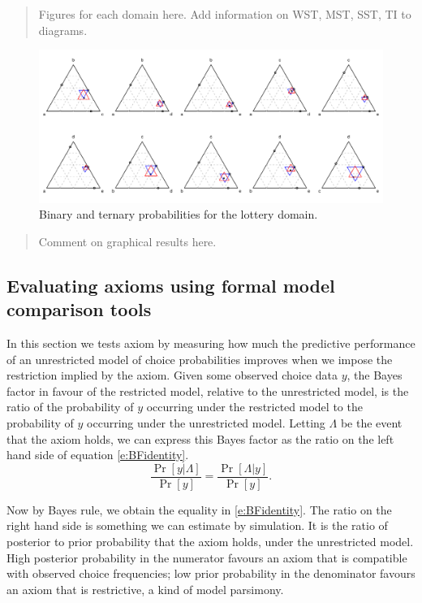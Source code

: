 \documentclass[11pt,letter]{article}
\begin{document}
\begin{quotation}
	Figures for each domain here. Add information on WST, MST, SST, TI to diagrams.
\end{quotation}

\begin{figure}
	\caption{Binary and ternary probabilities for the lottery domain.}\label{f:Dzero}
	\centering
	\includegraphics[width=16cm]{Figures/multi_aggregate_triples.pdf}
\end{figure}

\begin{quotation}
	Comment on graphical results here.
\end{quotation}

\subsection{Evaluating axioms using formal model comparison tools}

In this section we tests axiom by measuring how much the predictive performance of an unrestricted model of choice probabilities improves when we impose the restriction implied by the axiom.
Given some observed choice data $y$, the Bayes factor in favour of the restricted model, relative to the unrestricted model, is the ratio of the probability of $y$ occurring under the restricted model to the probability of $y$ occurring under the unrestricted model.
Letting $\Lambda$ be the event that the axiom holds, we can express this Bayes factor as the ratio on the left hand side of equation \eqref{e:BFidentity}.
\begin{equation}\label{e:BFidentity}
	\frac{\Pr[y|\Lambda]}{\Pr[y]} = \frac{\Pr[\Lambda|y]}{\Pr[y]}.
\end{equation}

Now by Bayes rule, we obtain the equality in \eqref{e:BFidentity}.
The ratio on the right hand side is something we can estimate by simulation.
It is the ratio of posterior to prior probability that the axiom holds, under the unrestricted model.
High posterior probability in the numerator favours an axiom that is compatible with observed choice frequencies; low prior probability in the denominator favours an axiom that is restrictive, a kind of model parsimony.
\end{document}
